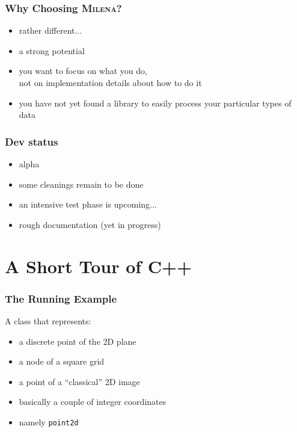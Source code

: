 \documentclass{beamer}
\newcommand{\cpp}{{C++}\xspace}
\newcommand{\code}[1]{{\scriptsize{\texttt{#1}}}\xspace}
\newcommand{\pointIId}{\code{point2d}}
\newcommand{\mln}{\textsc{Milena}\xspace}
\begin{document}
\begin{frame}%
  \frametitle{Why Choosing \mln?}

  \begin{itemize}
  \item rather different...
    \smallskip
  \item a strong potential
    \smallskip
  \item you want to focus on what you do,\\
    not on implementation details about how to do it
    \smallskip
  \item you have not yet found a library to easily process your
    particular types of data
  \end{itemize}

\end{frame}



\begin{frame}%
  \frametitle{Dev status}

  \begin{itemize}
  \item alpha
  \item some cleanings remain to be done
  \item an intensive test phase is upcoming...
  \item rough documentation (yet in progress)
  \end{itemize}

\end{frame}



\section{A Short Tour of \cpp}

\begin{frame}
  \frametitle{The Running Example}

  A class that represents:
  \begin{itemize}
  \item a discrete point of the 2D plane
  \item a node of a square grid
  \item a point of a ``classical'' 2D image 
  \item basically a couple of integer coordinates
  \item namely \pointIId
  \end{itemize}

\end{frame}
\end{document}
